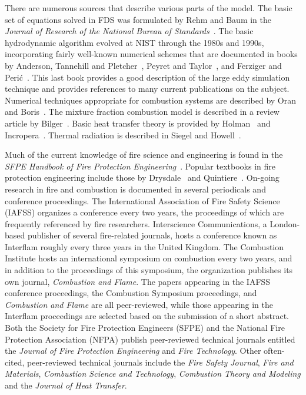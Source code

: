 \documentclass[11pt]{book}
\begin{document}
There are numerous sources that describe various parts of the
model. The basic set of equations solved in FDS was formulated by Rehm
and Baum in the {\em Journal of Research of the National Bureau of
Standards}~\cite{Rehm:1}.  The basic hydrodynamic algorithm evolved at
NIST through the 1980s and 1990s, incorporating fairly well-known
numerical schemes that are documented in books by Anderson, Tannehill
and Pletcher~\cite{Anderson:1}, Peyret and Taylor~\cite{Peyret:1}, and
Ferziger and Peri\'{c}~\cite{Ferziger:1}. This last book provides a
good description of the large eddy simulation technique and provides
references to many current publications on the subject.  Numerical
techniques appropriate for combustion systems are described by Oran
and Boris~\cite{Oran:1}.  The mixture fraction combustion model is
described in a review article by Bilger~\cite{Bilger:AnnRev}. Basic
heat transfer theory is provided by Holman~\cite{Holman:1} and
Incropera~\cite{Incropera:1}. Thermal radiation is described in Siegel
and Howell~\cite{Siegel:1}.

Much of the current knowledge of fire science and engineering
is found in the {\em SFPE Handbook of Fire Protection Engineering}~\cite{SFPE}. Popular textbooks in fire protection
engineering include those by Drysdale~\cite{Drysdale:1} and Quintiere~\cite{Quintiere:2}. On-going research in
fire and combustion is documented in several periodicals and conference proceedings.
The International Association of Fire Safety Science (IAFSS)
organizes a conference every two years, the proceedings of which are frequently referenced by fire researchers.
Interscience Communications, a London-based publisher of several fire-related journals, hosts a conference known as Interflam roughly
every three years in the United Kingdom.
The Combustion Institute hosts an international symposium on combustion every two years, and in addition to the
proceedings of this symposium, the organization publishes its own journal, {\em Combustion and Flame}.
The papers appearing in the IAFSS conference proceedings,
the Combustion Symposium proceedings, and {\em Combustion and Flame} are all peer-reviewed, while those appearing in the
Interflam proceedings are selected based on the submission of a short abstract.
Both the Society for Fire Protection Engineers (SFPE) and the National Fire Protection Association (NFPA) publish
peer-reviewed technical journals entitled the {\em Journal of Fire Protection Engineering} and {\em Fire Technology}.
Other often-cited, peer-reviewed technical journals include the {\em Fire Safety Journal}, {\em Fire and Materials}, {\em Combustion
Science and Technology}, {\em Combustion Theory and Modeling} and the {\em Journal of Heat Transfer}.
\end{document}
